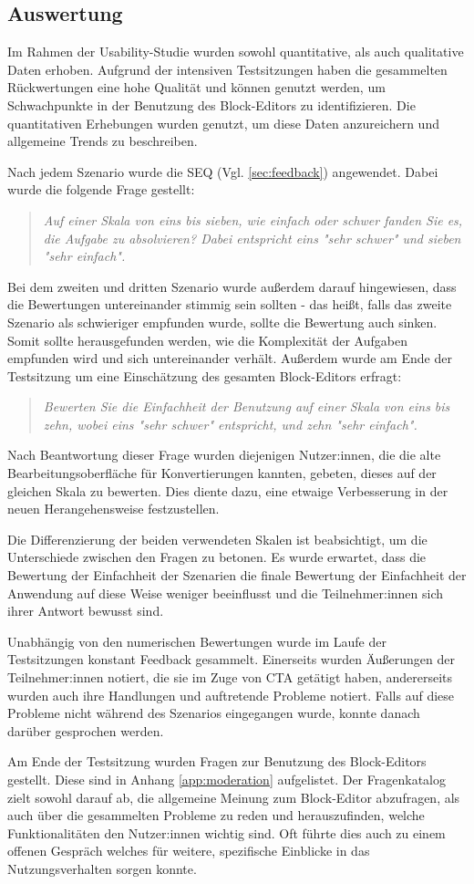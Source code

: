 \subsection{Auswertung}
Im Rahmen der Usability-Studie wurden sowohl quantitative, als auch qualitative Daten erhoben. Aufgrund der intensiven Testsitzungen haben die gesammelten Rückwertungen eine hohe Qualität und können genutzt werden, um Schwachpunkte in der Benutzung des Block-Editors zu identifizieren. Die quantitativen Erhebungen wurden genutzt, um diese Daten anzureichern und allgemeine Trends zu beschreiben.

Nach jedem Szenario wurde die \ac{SEQ} (Vgl. \ref{sec:feedback}) angewendet. Dabei wurde die folgende Frage gestellt:
\begin{quote}
  \textit{
    Auf einer Skala von eins bis sieben, wie einfach oder schwer fanden Sie es, die Aufgabe zu absolvieren? Dabei entspricht eins "sehr schwer" und sieben "sehr einfach".}
\end{quote}
Bei dem zweiten und dritten Szenario wurde außerdem darauf hingewiesen, dass die Bewertungen untereinander stimmig sein sollten - das heißt, falls das zweite Szenario als schwieriger empfunden wurde, sollte die Bewertung auch sinken. Somit sollte herausgefunden werden, wie die Komplexität der Aufgaben empfunden wird und sich untereinander verhält. Außerdem wurde am Ende der Testsitzung um eine Einschätzung des gesamten Block-Editors erfragt:
\begin{quote}
  \textit{
    Bewerten Sie die Einfachheit der Benutzung auf einer Skala von eins bis zehn, wobei eins "sehr schwer" entspricht, und zehn "sehr einfach".
  }
\end{quote}
Nach Beantwortung dieser Frage wurden diejenigen Nutzer:innen, die die alte Bearbeitungsoberfläche für Konvertierungen kannten, gebeten, dieses auf der gleichen Skala zu bewerten. Dies diente dazu, eine etwaige Verbesserung in der neuen Herangehensweise festzustellen.

Die Differenzierung der beiden verwendeten Skalen ist beabsichtigt, um die Unterschiede zwischen den Fragen zu betonen. Es wurde erwartet, dass die Bewertung der Einfachheit der Szenarien die finale Bewertung der Einfachheit der Anwendung auf diese Weise weniger beeinflusst und die Teilnehmer:innen sich ihrer Antwort bewusst sind.

Unabhängig von den numerischen Bewertungen wurde im Laufe der Testsitzungen konstant Feedback gesammelt. Einerseits wurden Äußerungen der Teilnehmer:innen notiert, die sie im Zuge von \ac{CTA} getätigt haben, andererseits wurden auch ihre Handlungen und auftretende Probleme notiert. Falls auf diese Probleme nicht während des Szenarios eingegangen wurde, konnte danach darüber gesprochen werden.

Am Ende der Testsitzung wurden Fragen zur Benutzung des Block-Editors gestellt. Diese sind in Anhang \ref{app:moderation} aufgelistet. Der Fragenkatalog zielt sowohl darauf ab, die allgemeine Meinung zum Block-Editor abzufragen, als auch über die gesammelten Probleme zu reden und herauszufinden, welche Funktionalitäten den Nutzer:innen wichtig sind. Oft führte dies auch zu einem offenen Gespräch welches für weitere, spezifische Einblicke in das Nutzungsverhalten sorgen konnte.
